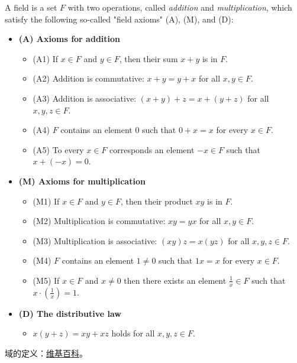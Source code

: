 \documentclass[../poma-notes.tex]{subfiles}
\begin{document}
\begin{definition}
  A field is a set $F$ with two operations, called \textit{addition} and \textit{multiplication},
  which satisfy the following so-called "field axioms" (A), (M), and (D):

  \begin{itemize}
    \item[] \textbf{(A) Axioms for addition}
      \begin{itemize}
        \item[] (A1) If $x \in F$ and $y \in F$, then their sum $x + y$ is in $F$.
        \item[] (A2) Addition is commutative: $x + y = y + x$ for all $x,y \in F$.
        \item[] (A3) Addition is associative: $(x+y)+z=x+(y+z)$ for all $x,y,z \in F$.
        \item[] (A4) $F$ contains an element 0 such that $0+x=x$ for every $x \in F$.
        \item[] (A5) To every $x \in F$ corresponds an element $-x \in F$ such that $x+(-x)=0$.
      \end{itemize}
    \item[] \textbf{(M) Axioms for multiplication}
      \begin{itemize}
        \item[] (M1) If $x \in F$ and $y \in F$, then their product $xy$ is in $F$.
        \item[] (M2) Multiplication is commutative: $xy = yx$ for all $x,y \in F$.
        \item[] (M3) Multiplication is associative: $(xy)z = x(yz)$ for all $x,y,z \in F$.
        \item[] (M4) $F$ contains an element $1 \ne 0$ such that $1x = x$ for every $x \in F$.
        \item[] (M5) If $x \in F$ and $x \ne 0$ then there exists an element $\frac{1}{x} \in F$
          such that $x \cdot (\frac{1}{x}) = 1$.
      \end{itemize}
    \item[] \textbf{(D) The distributive law}
      \begin{itemize}
        \item[] $x(y+z) = xy+xz$ holds for all $x,y,z \in F$.
      \end{itemize}
  \end{itemize}
\end{definition}

\begin{anote}
  域的定义：\href{https://en.wikipedia.org/wiki/Field_(mathematics)}{维基百科}。
\end{anote}
\end{document}
